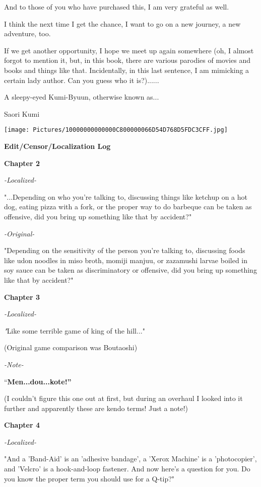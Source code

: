 \documentclass[
]{article}
\begin{document}
And to those of you who have purchased this, I am very grateful as well.

I think the next time I get the chance, I want to go on a new journey, a
new adventure, too.

If we get another opportunity, I hope we meet up again somewhere (oh, I
almost forgot to mention it, but, in this book, there are various
parodies of movies and books and things like that. Incidentally, in this
last sentence, I am mimicking a certain lady author. Can you guess who
it is?)......

A sleepy-eyed Kumi-Byuun, otherwise known as...

Saori Kumi

\texttt{[image: Pictures/10000000000000C800000066D54D768D5FDC3CFF.jpg]}

\textbf{Edit/Censor/Localization Log}

\textbf{Chapter 2}

\emph{-Localized-}

"...Depending on who you're talking to, discussing things like ketchup
on a hot dog, eating pizza with a fork, or the proper way to do barbeque
can be taken as offensive, did you bring up something like that by
accident?"

\emph{-Original-}

"Depending on the sensitivity of the person you're talking to,
discussing foods like udon noodles in miso broth, momiji manjuu, or
zazamushi larvae boiled in soy sauce can be taken as discriminatory or
offensive, did you bring up something like that by accident?"

\textbf{Chapter 3}

\emph{-Localized-}

\emph{"}Like some terrible game of king of the hill..."

(Original game comparison was Boutaoshi)

\emph{-Note-}

``\textbf{Men...dou...kote!''}

(I couldn't figure this one out at first, but during an overhaul I
looked into it further and apparently these are kendo terms! Just a
note!)

\textbf{Chapter 4}

\emph{-Localized-}

"And a 'Band-Aid' is an 'adhesive bandage', a 'Xerox Machine' is a
'photocopier', and 'Velcro' is a hook-and-loop fastener. And now here's
a question for you. Do you know the proper term you should use for a
Q-tip?"
\end{document}
